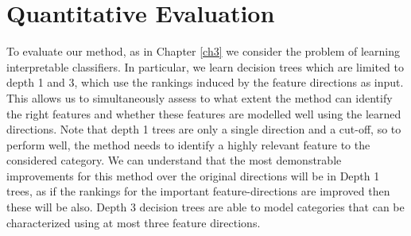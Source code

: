 
\section{Quantitative Evaluation}\label{secExperiments}

To evaluate our method, as in Chapter \ref{ch3} we consider the problem of learning interpretable classifiers. In particular, we learn decision trees which are limited to depth 1 and 3, which use the rankings induced by the feature directions as input. This allows us to simultaneously assess to what extent the method can identify the right features and whether these features are modelled well using the learned directions. Note that depth 1 trees are only a single direction and a cut-off, so to perform well, the method needs to identify a highly relevant feature to the considered category. We can understand that the most demonstrable improvements for this method over the original directions will be in Depth 1 trees, as if the rankings for the important feature-directions are improved then these will be also. Depth 3 decision trees are able to model categories that can be characterized using at most three feature directions.



